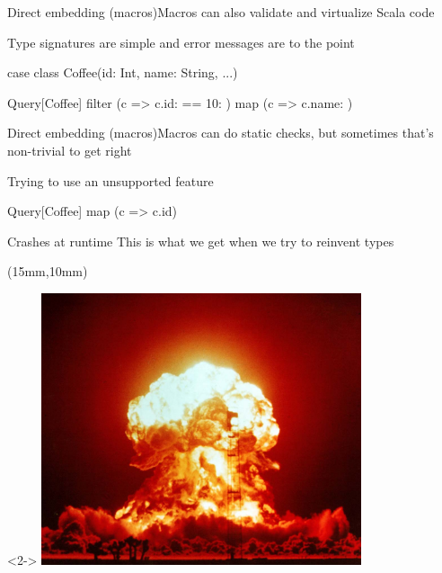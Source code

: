 \documentclass{beamer}
\begin{document}
\begin{frame}[fragile]{Direct embedding (macros)}{Macros can also validate and virtualize Scala code}
  \vspace{1em}
  \begin{exampleblock}{Type signatures are simple and error messages are to the point}
    \begin{semiverbatim}
case class Coffee(id: Int, name: String, ...)

Query[Coffee] filter
  (c => c.id: \text{\color{blue}{Int}} == 10: \text{\color{blue}{Int}}) map
  (c => c.name: \text{\color{blue}{String}})
    \end{semiverbatim}
  \end{exampleblock}
\end{frame}

\begin{frame}[fragile]{Direct embedding (macros)}{Macros can do static checks, but sometimes that's non-trivial to get right}
  \vspace{1em}
  \begin{exampleblock}{Trying to use an unsupported feature}
    \begin{semiverbatim}
Query[Coffee] map (c => c.id\text{\color{blue}{.toDouble}})
    \end{semiverbatim}
  \end{exampleblock}

  \vspace{1em}
  \begin{alertblock}{Crashes at runtime}
    This is what we get when we try to reinvent types
  \end{alertblock}

  \begin{textblock*}{\textwidth}(15mm,10mm)
    \begin{visibleenv}<2->
      \includegraphics[height=8cm]{img/boom.jpg}
    \end{visibleenv}
  \end{textblock*}
\end{frame}
\end{document}
